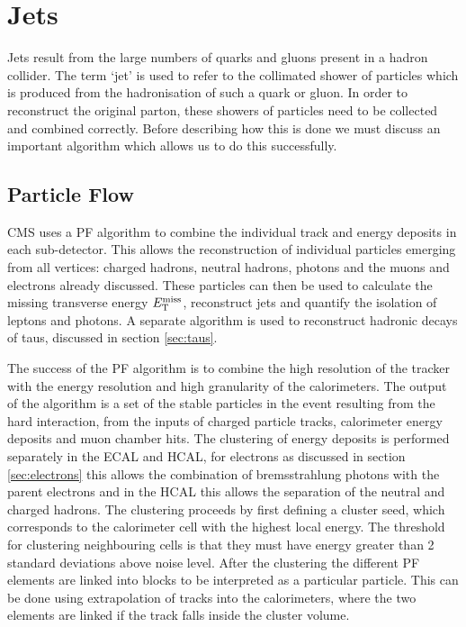 \section{Jets}
\label{sec:jets}

Jets result from the large numbers of quarks and gluons present in a hadron
collider. The term `jet' is used to refer to the collimated shower of particles
which is produced from the hadronisation of such a quark or gluon. In order to
reconstruct the original parton, these showers of particles need to be collected
and combined correctly. Before describing how this is done we must discuss an
important algorithm which allows us to do this successfully. 

\subsection{Particle Flow}
\label{sec:particleflow}

CMS uses a \ac{PF} \cite{CMS-PAS-PFT-09-001,CMS-PAS-PFT-10-001,CMS-PAS-PFT-10-002} 
algorithm to combine the individual track and energy deposits in each sub-detector. 
This allows the reconstruction of individual particles emerging from all vertices: charged
hadrons, neutral hadrons, photons and the muons and electrons already discussed.
These particles can then be 
used to calculate the missing transverse energy $E_{\mathrm{T}}^{\text{miss}}$,
reconstruct jets and quantify the isolation of leptons and photons. A separate
algorithm is used to reconstruct hadronic decays of taus, discussed in section
\ref{sec:taus}. 

The success of the \ac{PF} algorithm is to combine the high resolution of
the tracker with the energy resolution and high granularity of the calorimeters.
The output of the algorithm is a set of the stable particles in the event
resulting from the hard interaction, from the inputs of charged particle tracks,
calorimeter energy deposits and muon chamber hits. The clustering of energy
deposits is performed separately in the \ac{ECAL} and \ac{HCAL}, for electrons
as discussed in section \ref{sec:electrons} this allows the combination of
bremsstrahlung photons with the parent electrons and in the \ac{HCAL} this
allows the separation of the neutral and charged hadrons. The clustering
proceeds by first defining a cluster seed, which corresponds to the calorimeter
cell with the highest local energy. The threshold for clustering neighbouring
cells is that they must have energy greater than 2 standard deviations above
noise level. After the clustering the different \ac{PF} elements are linked into
blocks to be interpreted as a particular particle. This can be done using
extrapolation of tracks into the calorimeters, where the two elements are linked
if the track falls inside the cluster volume.

